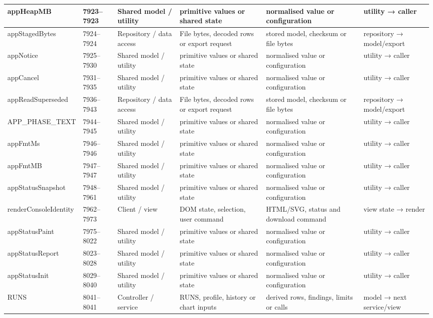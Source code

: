 \begin{landscape}
\begin{longtable}{@{}p{3.2cm}p{1.45cm}p{2.7cm}p{4.0cm}p{4.0cm}p{3.0cm}@{}}
appHeapMB & 7923--7923 & Shared model / utility & primitive values or shared state & normalised value or configuration & utility → caller \\\hline
appStagedBytes & 7924--7924 & Repository / data access & File bytes, decoded rows or export request & stored model, checksum or file bytes & repository → model/export \\\hline
appNotice & 7925--7930 & Shared model / utility & primitive values or shared state & normalised value or configuration & utility → caller \\\hline
appCancel & 7931--7935 & Shared model / utility & primitive values or shared state & normalised value or configuration & utility → caller \\\hline
appReadSuperseded & 7936--7943 & Repository / data access & File bytes, decoded rows or export request & stored model, checksum or file bytes & repository → model/export \\\hline
APP\_PHASE\_TEXT & 7944--7945 & Shared model / utility & primitive values or shared state & normalised value or configuration & utility → caller \\\hline
appFmtMs & 7946--7946 & Shared model / utility & primitive values or shared state & normalised value or configuration & utility → caller \\\hline
appFmtMB & 7947--7947 & Shared model / utility & primitive values or shared state & normalised value or configuration & utility → caller \\\hline
appStatusSnapshot & 7948--7961 & Shared model / utility & primitive values or shared state & normalised value or configuration & utility → caller \\\hline
renderConsoleIdentity & 7962--7973 & Client / view & DOM state, selection, user command & HTML/SVG, status and download command & view state → render \\\hline
appStatusPaint & 7975--8022 & Shared model / utility & primitive values or shared state & normalised value or configuration & utility → caller \\\hline
appStatusReport & 8023--8028 & Shared model / utility & primitive values or shared state & normalised value or configuration & utility → caller \\\hline
appStatusInit & 8029--8040 & Shared model / utility & primitive values or shared state & normalised value or configuration & utility → caller \\\hline
RUNS & 8041--8041 & Controller / service & RUNS, profile, history or chart inputs & derived rows, findings, limits or calls & model → next service/view \\\hline

\end{longtable}
\end{landscape}
